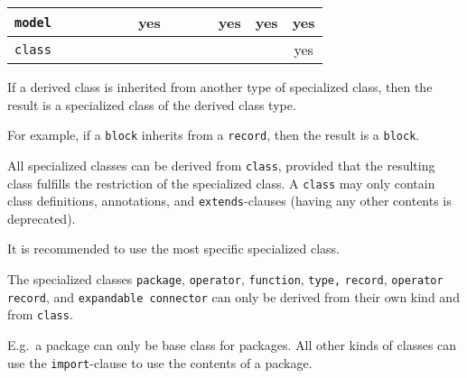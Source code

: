 \begin{center}
{\begin{tabular}{|c||c|c|c|c|c|c|c|c|c|c|c|c|}
    \hline
    {\lstinline!model!}             &                          &                           &                                            &                      &                          & \cellcolor{lightgray}yes &                          &                          &                            & \cellcolor{lightgray}yes & yes                    & \cellcolor{lightgray}yes                   \\
    \hline
    {\lstinline!class!}             &                          &                           &                                            &                      &                          &                          &                          &                          &                            &                          &                        & yes                                        \\
    \hline
\end{tabular}
\ifpdf}\else\fi%
\end{center}

If a derived class is inherited from another type of specialized class,
then the result is a specialized class of the derived class type.

\begin{nonnormative}
For example, if a \lstinline!block! inherits from a \lstinline!record!, then the result is a \lstinline!block!.
\end{nonnormative}

All specialized classes can be derived from \lstinline!class!, provided that the resulting class fulfills the restriction of the specialized class.
A \lstinline!class! may only contain class definitions, annotations, and \lstinline!extends!-clauses (having any other contents is deprecated).

\begin{nonnormative}
It is recommended to use the most specific specialized class.
\end{nonnormative}

The specialized classes \lstinline!package!, \lstinline!operator!, \lstinline!function!,
\lstinline!type,! \lstinline!record!,
\lstinline!operator record!, and \lstinline!expandable connector! can only be derived from their
own kind and from \lstinline!class!.

\begin{nonnormative}
E.g.\ a package can only be base class for packages.
All other kinds of classes can use the \lstinline!import!-clause to use the contents of a package.
\end{nonnormative}

